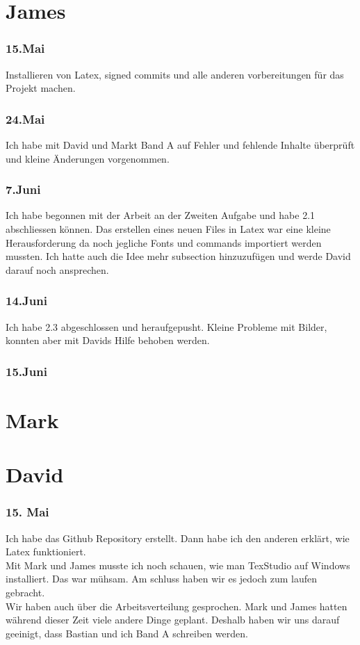 \documentclass[10pt]{article}
\begin{document}
			
			
	\section{James}
	\subsubsection{15.Mai}
	Installieren von Latex, signed commits und alle anderen vorbereitungen für das Projekt machen.
	\subsubsection{24.Mai}
	Ich habe mit David und Markt Band A auf Fehler und fehlende Inhalte überprüft und kleine Änderungen vorgenommen.
	\subsubsection{7.Juni}
	Ich habe begonnen mit der Arbeit an der Zweiten Aufgabe und habe 2.1 abschliessen können. Das erstellen eines neuen Files in Latex war eine kleine Herausforderung da noch jegliche Fonts und commands importiert werden mussten. Ich hatte auch die Idee mehr subsection hinzuzufügen und werde David darauf noch ansprechen.
	\subsubsection{14.Juni}
	Ich habe 2.3 abgeschlossen und heraufgepusht. Kleine Probleme mit Bilder, konnten aber mit Davids Hilfe behoben werden.
	\subsubsection{15.Juni}
	\section{Mark}
	\section{David}
	\subsubsection{15. Mai}
	Ich habe das Github Repository erstellt. Dann habe ich den anderen erklärt, wie Latex funktioniert.\\
	Mit Mark und James musste ich noch schauen, wie man TexStudio auf Windows installiert. Das war mühsam. Am schluss haben wir es jedoch zum laufen gebracht.\\
	Wir haben auch über die Arbeitsverteilung gesprochen. Mark und James hatten während dieser Zeit viele andere Dinge geplant. Deshalb haben wir uns darauf geeinigt, dass Bastian und ich Band A schreiben werden.\\
\end{document}
